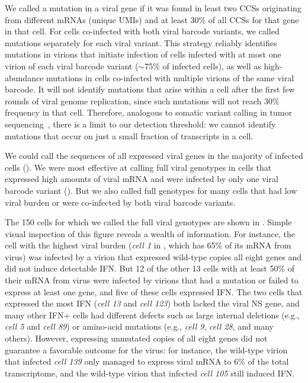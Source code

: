 \documentclass[9pt,lineno]{template}
\begin{document}
We called a mutation in a viral gene if it was found in least two CCSs originating from different mRNAs (unique UMIs) and at least 30\% of all CCSs for that gene in that cell.
For cells co-infected with both viral barcode variants, we called mutations separately for each viral variant.
This strategy reliably identifies mutations in virions that initiate infection of cells infected with at most one virion of each viral barcode variant ($\sim$75\% of infected cells), as well as high-abundance mutations in cells co-infected with multiple virions of the same viral barcode.
It will not identify mutations that arise within a cell after the first few rounds of viral genome replication, since such mutations will not reach 30\% frequency in that cell.
Therefore, analogous to somatic variant calling in tumor sequencing~\citep{xu2014comparison, cibulskis2013sensitive}, there is a limit to our detection threshold: we cannot identify mutations that occur on just a small fraction of transcripts in a cell. 

We could call the sequences of all expressed viral genes in the majority of infected cells ().
We were most effective at calling full viral genotypes in cells that expressed high amounts of viral mRNA and were infected by only one viral barcode variant ().
But we also called full genotypes for many cells that had low viral burden or were co-infected by both viral barcode variants.

The 150 cells for which we called the full viral genotypes are shown in .
Simple visual inspection of this figure reveals a wealth of information.
For instance, the cell with the highest viral burden (\textit{cell 1} in , which has 65\% of its mRNA from virus) was infected by a virion that expressed wild-type copies all eight genes and did not induce detectable IFN.
But 12 of the other 13 cells with at least 50\% of their mRNA from virus were infected by virions that had a mutation or failed to express at least one gene, and five of these cells expressed IFN.
The two cells that expressed the most IFN (\textit{cell 13} and \textit{cell 123}) both lacked the viral NS gene, and many other IFN+ cells had different defects such as large internal deletions (e.g., \textit{cell 5} and \textit{cell 89}) or amino-acid mutations (e.g., \textit{cell 9}, \textit{cell 28}, and many others).
However, expressing unmutated copies of all eight genes did not guarantee a favorable outcome for the virus: for instance, the wild-type virion that infected \textit{cell 139} only managed to express viral mRNA to 6\% of the total transcriptome, and the wild-type virion that infected \textit{cell 105} still induced IFN.
\end{document}
